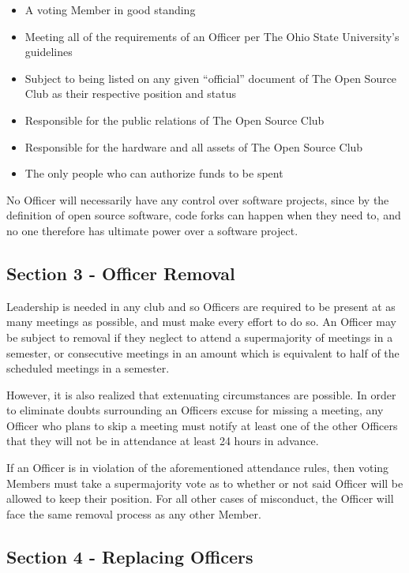 \documentclass{article}
\begin{document}
    \begin{itemize}
      \item A voting Member in good standing
      \item Meeting all of the requirements of an Officer per The Ohio State University's guidelines
      \item Subject to being listed on any given ``official'' document of The Open Source Club as their respective position and status
      \item Responsible for the public relations of The Open Source Club
      \item Responsible for the hardware and all assets of The Open Source Club
      \item The only people who can authorize funds to be spent
    \end{itemize}

	No Officer will necessarily have any control over software projects, since by the definition of open source software, code forks can happen when they need to, and no one therefore has ultimate power over a software project.

	\subsection{Section 3 - Officer Removal}

	Leadership is needed in any club and so Officers are required to be present at as many meetings as possible, and must make every effort to do so.  An Officer may be subject to removal if they neglect to attend a supermajority of meetings in a semester, or consecutive meetings in an amount which is equivalent to half of the scheduled meetings in a semester.

  However, it is also realized that extenuating circumstances are possible.  In order to eliminate doubts surrounding an Officers excuse for missing a meeting, any Officer who plans to skip a meeting must notify at least one of the other Officers that they will not be in attendance at least 24 hours in advance.

  If an Officer is in violation of the aforementioned attendance rules, then voting Members must take a supermajority vote as to whether or not said Officer will be allowed to keep their position. For all other cases of misconduct, the Officer will face the same removal process as any other Member.

	\subsection{Section 4 - Replacing Officers}
\end{document}
